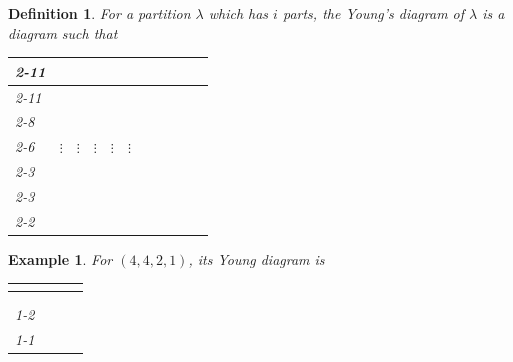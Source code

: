 \documentclass[10pt]{article}
\newtheorem{definition}{Definition}[section]
\newtheorem{example}{Example}[section]
\numberwithin{equation}{theorem}
\begin{document}
\begin{definition}
  For a partition $\lambda$ which has $i$ parts, the Young's diagram of $\lambda$ is a diagram such that 
  \begin{center}
\begin{tabular}{lllllllllll}
\cline{2-11}
\multicolumn{1}{l|}{$\lambda_1$}     & \multicolumn{1}{l|}{} & \multicolumn{1}{l|}{} & \multicolumn{1}{l|}{} & \multicolumn{1}{l|}{} & \multicolumn{1}{l|}{} & \multicolumn{1}{l|}{} & \multicolumn{1}{l|}{} & \multicolumn{1}{l|}{} & \multicolumn{1}{l|}{} & \multicolumn{1}{l|}{} \\ \cline{2-11} 
\multicolumn{1}{l|}{$\lambda_2$}     & \multicolumn{1}{l|}{} & \multicolumn{1}{l|}{} & \multicolumn{1}{l|}{} & \multicolumn{1}{l|}{} & \multicolumn{1}{l|}{} & \multicolumn{1}{l|}{} & \multicolumn{1}{l|}{} &                       &                       &                       \\ \cline{2-8}
\multicolumn{1}{l|}{$\lambda_3$}     & \multicolumn{1}{l|}{} & \multicolumn{1}{l|}{} & \multicolumn{1}{l|}{} & \multicolumn{1}{l|}{} & \multicolumn{1}{l|}{} &                       &                       &                       &                       &                       \\ \cline{2-6}
                                     & $\vdots$              & $\vdots$              & $\vdots$              & $\vdots$              & $\vdots$              &                       &                       &                       &                       &                       \\ \cline{2-3}
\multicolumn{1}{l|}{$\lambda_{i-1}$} & \multicolumn{1}{l|}{} & \multicolumn{1}{l|}{} &                       &                       &                       &                       &                       &                       &                       &                       \\ \cline{2-3}
\multicolumn{1}{l|}{$\lambda_i$}     & \multicolumn{1}{l|}{} &                       &                       &                       &                       &                       &                       &                       &                       &                       \\ \cline{2-2}
\end{tabular}
  \end{center}
\end{definition}
\begin{example}
  For $(4,4,2,1)$, its Young diagram is 
  \begin{center}
    \begin{tabular}{|l|lll}
\hline
 & \multicolumn{1}{l|}{} & \multicolumn{1}{l|}{} & \multicolumn{1}{l|}{} \\ \hline
 & \multicolumn{1}{l|}{} & \multicolumn{1}{l|}{} & \multicolumn{1}{l|}{} \\ \hline
 & \multicolumn{1}{l|}{} &                       &                       \\ \cline{1-2}
 &                       &                       &                       \\ \cline{1-1}
\end{tabular}
  \end{center}
\end{example}
\end{document}
